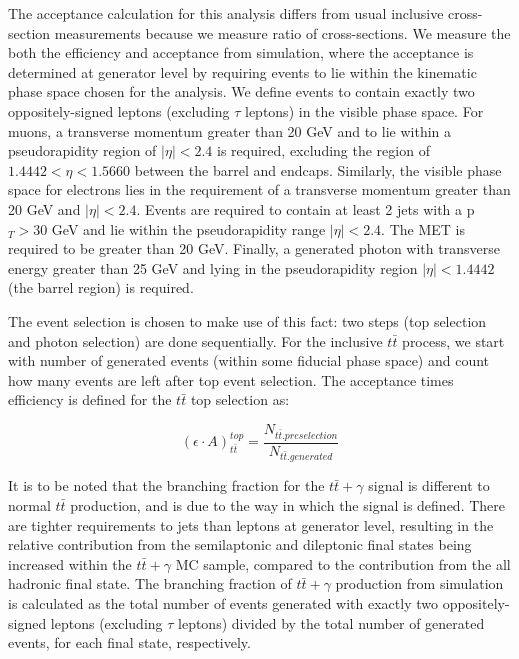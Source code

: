 The acceptance calculation for this analysis differs from usual inclusive cross-section measurements because we measure ratio of cross-sections. We measure the both the efficiency and acceptance from simulation, where the acceptance is determined at generator level by requiring events to lie within the kinematic phase space chosen for the analysis. We define events to contain exactly two oppositely-signed leptons (excluding $\tau$ leptons) in the visible phase space. For muons, a transverse momentum greater than 20 GeV and to lie within a pseudorapidity region of $|\eta| < 2.4$ is required, excluding the region of $1.4442 < \eta < 1.5660$ between the barrel and endcaps. Similarly, the visible phase space for electrons lies in the requirement of a transverse momentum greater than 20 GeV and $|\eta| < 2.4$. Events are required to contain at least 2 jets with a p$_T > 30$ GeV and lie within the pseudorapidity range $|\eta| < 2.4$. The MET is required to be greater than 20 GeV. Finally, a generated photon with transverse energy greater than 25 GeV and lying in the pseudorapidity region $|\eta| < 1.4442$ (the barrel region) is required. 

The event selection is chosen to make use of this fact: two steps (top selection and photon selection) are done sequentially. For the inclusive $t\bar{t}$ process, we start with number of generated events (within some fiducial phase space) and count how many events are left after top event selection. The acceptance times efficiency is defined for the $t\bar{t}$ top selection as:

\begin{equation}
	(\epsilon \cdot A)_{t\bar{t}}^{top} = \frac{N_{t\bar{t}.preselection}}{N_{t\bar{t}.generated}} 
\end{equation}


It is to be noted that the branching fraction for the $t\bar{t}+\gamma$ signal is different to normal $t\bar{t}$ production, and is due to the way in which the signal is defined. There are tighter requirements to jets than leptons at generator level, resulting in the relative contribution from the semilaptonic and dileptonic final states being increased within the $t\bar{t}+\gamma$ MC sample, compared to the contribution from the all hadronic final state. The branching fraction of $t\bar{t}+\gamma$ production from simulation is calculated as the total number of events generated with exactly two oppositely-signed leptons (excluding $\tau$ leptons) divided by the total number of generated events, for each final state, respectively. 

